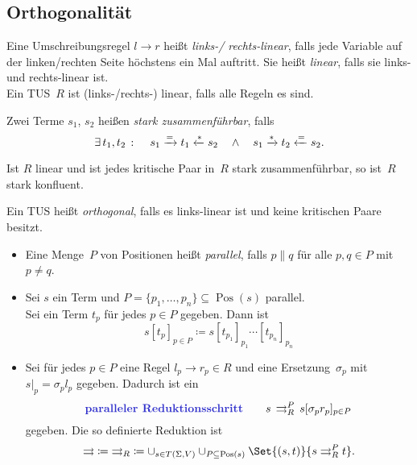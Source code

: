 \documentclass{cheat-sheet}
\newcommand{\reducesTo}{\xrightarrow{*}}
\newcommand{\reducesFrom}{\xleftarrow{*}}
\newcommand{\toOrEq}{\xrightarrow{=}}
\newcommand{\fromOrEq}{\xleftarrow{=}}
\DeclareMathOperator{\Pos}{Pos} %
\newcommand{\parallelTo}{\rightrightarrows} %
\begin{document}

\subsection{Orthogonalität}

\begin{defn}
  Eine Umschreibungsregel $l \to r$ heißt \emph{links-/ rechts-linear}, falls jede Variable auf der linken/rechten Seite höchstens ein Mal auftritt.
  Sie heißt \emph{linear}, falls sie links- und rechts-linear ist. \\
  Ein TUS~$R$ ist (links-/rechts-) linear, falls alle Regeln es sind.
\end{defn}

\begin{defn}
  Zwei Terme $s_1$, $s_2$ heißen \emph{stark zusammenführbar}, falls
  \[
    \ex{t_1, t_2} \quad
    s_1 \toOrEq{} t_1 \reducesFrom{} s_2
    \quad \wedge \quad
    s_1 \reducesTo{} t_2 \fromOrEq{} s_2.
  \]
\end{defn}

\begin{lem}
  Ist $R$ linear und ist jedes kritische Paar in~$R$ stark zusammenführbar, so ist~$R$ stark konfluent.
\end{lem}

\begin{defn}
  Ein TUS heißt \emph{orthogonal}, falls es links-linear ist und keine kritischen Paare besitzt.
\end{defn}

\begin{defn}
  \begin{itemize}
    \item Eine Menge~$P$ von Positionen heißt \emph{parallel}, falls $p \parallel q$ für alle $p, q \in P$ mit $p \not= q$.
    \item
      Sei $s$ ein Term und $P = \{ p_1, \ldots, p_n \} \subseteq \Pos(s)$ parallel. \\
      Sei ein Term $t_p$ für jedes $p \in P$ gegeben.
      Dann ist
      \[ s[t_p]_{p \in P} \coloneqq s[t_{p_1}]_{p_1} \cdots [t_{p_n}]_{p_n} \]
    \item
      Sei für jedes $p \in P$ eine Regel $l_p \to r_p \in R$ und eine Ersetzung~$\sigma_p$ mit $s|_p = \sigma_p l_p$ gegeben.
      Dadurch ist ein
      \[
        \text{\emph{paralleler Reduktionsschritt}} \qquad
        s \, \parallelTo_R^P \, s [\sigma_p r_p]_{p \in P}
      \]
      gegeben.
      Die so definierte Reduktion ist
      \[
        {\parallelTo} \coloneqq {\parallelTo_R} \coloneqq \cup_{s \in T(\Sigma, V)} \cup_{P \subseteq \Pos(s)} \Set{(s, t)}{s \parallelTo_R^P t}.
      \]
  \end{itemize}
\end{defn}
\end{document}
